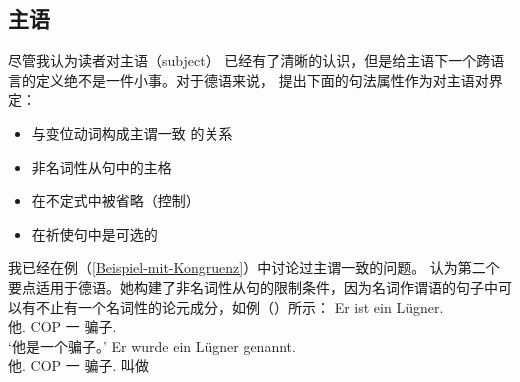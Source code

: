 \subsection{主语}
\label{Abschnitt-Subjekt}
尽管我认为读者对主语（subject） 已经有了清晰的认识，但是给主语下一个跨语言的定义绝不是一件小事。对于德语来说，\citet{Reis82} 提出下面的句法属性作为对主语对界定：
\begin{itemize}
\item 与变位动词构成主谓一致 的关系
\item 非名词性从句中的主格
\item 在不定式中被省略（控制）
\item 在祈使句中是可选的
\end{itemize}
我已经在例（\ref{Beispiel-mit-Kongruenz}）中讨论过主谓一致的问题。\citet{Reis82} 认为第二个要点适用于德语。她构建了非名词性从句的限制条件，因为名词作谓语的句子中可以有不止有一个名词性的论元成分，如例（）所示：
\eal
\ex
\gll Er ist ein Lügner.\\
     他.\nom{} COP 一 骗子.\nom{}\\
\glt `他是一个骗子。'
\ex 
\gll Er wurde ein Lügner genannt.\\
     他.\nom{} COP 一 骗子.\nom{} 叫做\\
